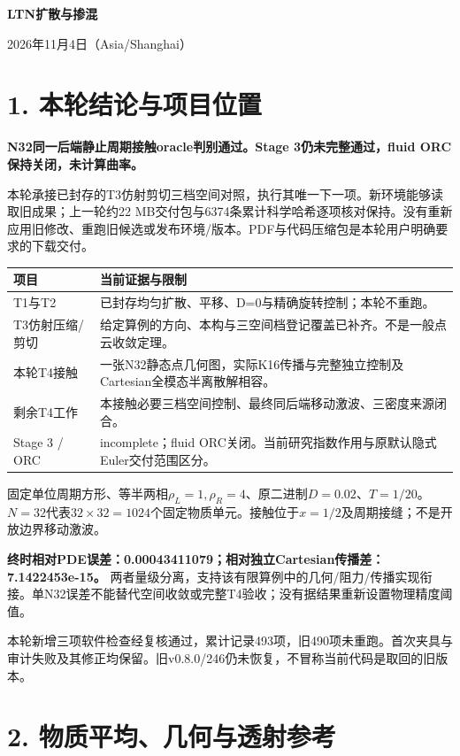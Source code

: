 \documentclass[11pt,a4paper]{article}
\begin{document}
\begin{center}{\LARGE\bfseries LTN扩散与掺混}\par\vspace{3mm}{\Large 同一普通FV周期接触oracle判别}\par\vspace{3mm}2026年11月4日（Asia/Shanghai）\end{center}
\section*{1. 本轮结论与项目位置}
\textbf{N32同一后端静止周期接触oracle判别通过。Stage 3仍未完整通过，fluid ORC保持关闭，未计算曲率。}

本轮承接已封存的T3仿射剪切三档空间对照，执行其唯一下一项。新环境能够读取旧成果；上一轮约22 MB交付包与6374条累计科学哈希逐项核对保持。没有重新应用旧修改、重跑旧候选或发布环境/版本。PDF与代码压缩包是本轮用户明确要求的下载交付。

\begin{center}\begin{tabular}{p{35mm}p{111mm}}\toprule
项目 & 当前证据与限制\\\midrule
T1与T2 & 已封存均匀扩散、平移、D=0与精确旋转控制；本轮不重跑。\\
T3仿射压缩/剪切 & 给定算例的方向、本构与三空间档登记覆盖已补齐。不是一般点云收敛定理。\\
本轮T4接触 & 一张N32静态点几何图，实际K16传播与完整独立控制及Cartesian全模态半离散解相容。\\
剩余T4工作 & 本接触必要三档空间控制、最终同后端移动激波、三密度来源闭合。\\
Stage 3 / ORC & incomplete；fluid ORC关闭。当前研究指数作用与原默认隐式Euler交付范围区分。\\\bottomrule
\end{tabular}\end{center}

固定单位周期方形、等半两相$\rho_L=1,\rho_R=4$、原二进制$D=0.02$、$T=1/20$。$N=32$代表$32\times32=1024$个固定物质单元。接触位于$x=1/2$及周期接缝；不是开放边界移动激波。

\textbf{终时相对PDE误差：0.00043411079；相对独立Cartesian传播差：7.1422453e-15。} 两者量级分离，支持该有限算例中的几何/阻力/传播实现衔接。单N32误差不能替代空间收敛或完整T4验收；没有据结果重新设置物理精度阈值。

本轮新增三项软件检查经复核通过，累计记录493项，旧490项未重跑。首次夹具与审计失败及其修正均保留。旧v0.8.0/246仍未恢复，不冒称当前代码是取回的旧版本。
\newpage
\section*{2. 物质平均、几何与透射参考}
\end{document}
